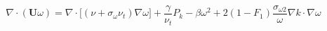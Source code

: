 \documentclass[12pt]{article}
\begin{document}
\begin{equation*}
\nabla \cdot (\mathbf{U} \omega) = \nabla \cdot \bigl[(\nu + \sigma_\omega \nu_t) \nabla \omega\bigr] + \frac{\gamma}{\nu_t} P_k - \beta \omega^2 + 2(1 - F_1) \frac{\sigma_{\omega 2}}{\omega} \nabla k \cdot \nabla \omega
\end{equation*}
\end{document}
